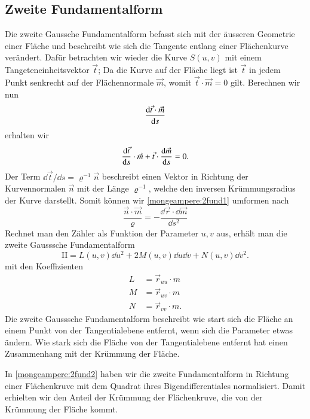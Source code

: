 \subsection{Zweite Fundamentalform}
Die zweite Gaussche Fundamentalform befasst sich mit der äusseren Geometrie einer 
Fläche und beschreibt wie sich die Tangente entlang einer Flächenkurve verändert.
Dafür betrachten wir wieder die Kurve $S(u,v)$ mit einem Tangeteneinheitsvektor 
$\vec t$;
Da die Kurve auf der Fläche liegt ist $\vec t$ in jedem Punkt senkrecht auf der 
Flächennormale $\vec m$, womit $\vec t \cdot \vec m = 0$ gilt. 
Berechnen wir nun 
\begin{equation}
  \dv{\vec t \cdot \vec m}{s}
  \label{mongeampere:2fund0}
\end{equation}
erhalten wir 
\begin{equation}
  \dv{\vec t}{s} \cdot \vec m + \vec t \cdot \dv{\vec m}{s} = 0. 
  \label{mongeampere:2fund1}
\end{equation}
Der Term $\dd \vec t / \dd s = \varrho^{-1} \vec n$ beschreibt einen Vektor in Richtung der Kurvennormalen 
$\vec n$ mit der Länge $\varrho^{-1}$, welche den inversen Krümmungsradius der Kurve 
darstellt.
Somit können wir \eqref{mongeampere:2fund1} umformen nach
\begin{equation}
  \frac{\vec n \cdot \vec m}{\varrho} = - \frac{\dd \vec r \cdot \dd \vec m }{\dd s^2} 
  \label{mongeampere:2fund2}
\end{equation}
Rechnet man den Zähler als Funktion der Parameter $u, v$ aus, erhält man die zweite 
Gausssche Fundamentalform
\begin{equation}
  \mathrm{I\!I} = L(u, v) \dd u^2 + 2 M (u,v) \dd u \dd v + N(u,v) \dd v^2.
  \label{mongeampere:2fund}
\end{equation}
mit den Koeffizienten
\begin{align*}
  L &= \vec r_{uu} \cdot m \\ 
  M &= \vec r_{uv} \cdot m \\
  N &= \vec r_{vv} \cdot m.
  \label{mongeampere:2fundkoef}
\end{align*}
Die zweite Gausssche Fundamentalform beschreibt wie start sich die Fläche an einem Punkt
von der Tangentialebene entfernt, wenn sich die Parameter etwas ändern.
Wie stark sich die Fläche von der Tangentialebene entfernt hat einen Zusammenhang mit der Krümmung der Fläche.

In \eqref{mongeampere:2fund2} haben wir die zweite Fundamentalform in Richtung einer Flächenkruve mit
dem Quadrat ihres Bigendifferentiales normalisiert.
Damit erhielten wir den Anteil der Krümmung der Flächenkruve, die von der Krümmung der Fläche kommt.
